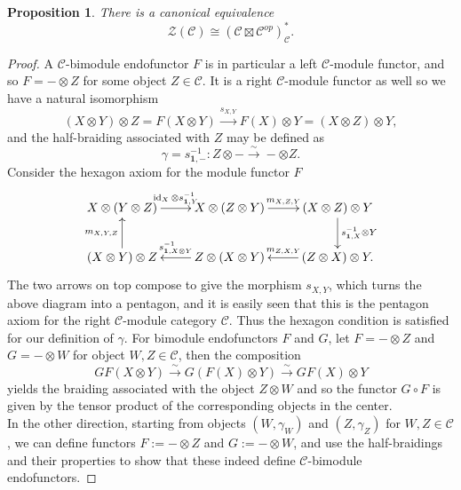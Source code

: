 \documentclass[a4paper, 10pt]{book}
\newtheorem{Prop}[theorem]{Proposition}
\theoremstyle{definition}
\numberwithin{equation}{chapter}
\newcommand\inv{^{-1}}
\newcommand\id{\operatorname{id}}
\newcommand\ot{\otimes}
\newcommand\C{\mathcal C}
\newcommand\CTR{\mathcal Z}
\newcommand{\xra}\xrightarrow
\newcommand\one{\mathbf{1}}
\begin{document}
\begin{Prop}
There is a canonical equivalence \begin{equation}
	\CTR(\C) \cong (\C\boxtimes \C^{op})^*_{\C} .
\end{equation}
\end{Prop}
\begin{proof}
A $\C$-bimodule endofunctor $F$ is in particular a left $\C$-module functor, and so $F= -\ot Z$ for some object $Z\in \C$. It is a right $\C$-module functor as well so we have a natural isomorphism \begin{equation}
	(X\ot Y) \ot Z = F(X\ot Y) \xra{s_{X, Y}} F(X) \ot Y = (X\ot Z)\ot Y,
\end{equation}
and the half-braiding associated with $Z$ may be defined as \begin{equation}
	 \gamma = s\inv_{\one, -}: Z \ot - \xra{\sim} -\ot Z.
\end{equation}
Consider the hexagon axiom for the module functor $F$
\[
\xymatrix{
X \ot (Y\ot Z) \ar[r]^{\id_X \ot s\inv_{\one, Y}} & X \ot (Z \ot Y)\ar[r]^{m_{X, Z, Y}} & (X\ot Z) \ot Y \ar[d]^{s\inv_{\one, X} \ot Y} \\
(X\ot Y )\ot Z \ar[u]^{m_{X, Y, Z}}& Z\ot (X\ot Y)\ar[l]_{s\inv_{\one, X\ot Y}} & (Z \ot X) \ot Y. \ar[l]_{m_{Z, X, Y}}  \\   
}
\]
The two arrows on top compose to give the morphism $s_{X, Y}$, which turns the above diagram into a pentagon, and it is easily seen that this is the pentagon axiom for the right $\C$-module category $\C$. Thus the hexagon condition is satisfied for our definition of $\gamma$.
For bimodule endofunctors $F$ and $G$, let $F= -\ot Z$ and $G = -\ot W$ for object $W, Z \in \C$, then the composition \begin{equation}
	GF(X\ot Y) \xra{\sim} G(F(X)\ot Y) \xra{\sim}GF(X) \ot Y
\end{equation} yields the braiding associated with the object $Z\ot W$ and so the functor $G\circ F$ is given by the tensor product of the corresponding objects in the center.\\
 In the other direction, starting from objects $(W, \gamma_W)$ and $(Z, \gamma_Z)$ for $W, Z \in \C$, we can define functors $F:= -\ot Z$ and $G:= -\ot W$, and use the half-braidings and their properties to show that these indeed define $\C$-bimodule endofunctors.
\end{proof}
\end{document}
